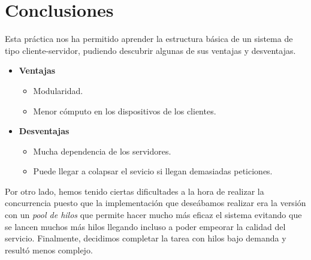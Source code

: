 \documentclass[10pt, spanish, pdftex]{template/UC3M_document}
\begin{document}
\newpage
\section{Conclusiones}
Esta práctica nos ha permitido aprender la estructura básica de un sistema de tipo cliente-servidor, pudiendo descubrir algunas de sus ventajas y desventajas.

\begin{itemize}
  \item \textbf{Ventajas}
    \begin{itemize}
      \item Modularidad.
      \item Menor cómputo en los dispositivos de los clientes.
    \end{itemize}
  \item \textbf{Desventajas}
  \begin{itemize}
    \item Mucha dependencia de los servidores.
    \item Puede llegar a colapsar el sevicio si llegan demasiadas peticiones.
  \end{itemize}
\end{itemize}

Por otro lado, hemos tenido ciertas dificultades a la hora de realizar la concurrencia puesto que la implementación que deseábamos realizar era la versión con un \textit{pool de hilos} que permite hacer mucho más eficaz el sistema evitando que se lancen muchos más hilos llegando incluso a poder empeorar la calidad del servicio. Finalmente, decidimos completar la tarea con hilos bajo demanda y resultó menos complejo.
\end{document}
